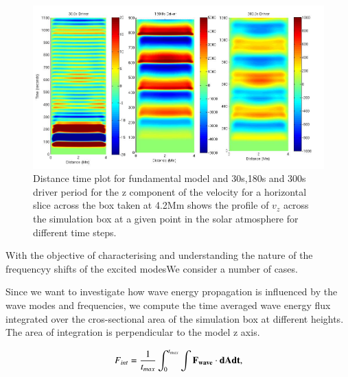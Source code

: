 \documentclass[final,1p]{elsarticle}
\begin{document}

\begin{figure}[h]\label{fig7_dt_30_180_300_0_horiz_4p2Mm}
\includegraphics[scale=0.5]{images/fig7_dt_30_180_300_0_horiz_4p2Mm.jpg}
\caption{Distance time plot for fundamental model and 30s,180s and 300s driver period for the z component of the velocity for a horizontal slice across the box  taken at 4.2Mm shows  the profile of $v_{z}$ across the simulation box at a given point in the solar atmosphere for different time steps. }
\end{figure}




















With the objective of characterising and understanding the nature of the frequencyy shifts of the excited modesWe consider a number of cases.

Since we want to investigate how wave energy propagation is influenced by the wave modes and frequencies, we compute the time averaged wave energy flux integrated over the cros-sectional area of the simulation box at different heights. The area of integration is perpendicular to the model z axis.

\begin{equation}\label{eqwaveenergyfluxintegral}
F_{int}= \frac{1}{t_{max}} \int_{0}^{t_{max}} \int         \bf{F_{wave}} \cdot d\bf{A}   dt   ,
\end{equation}
\end{document}

